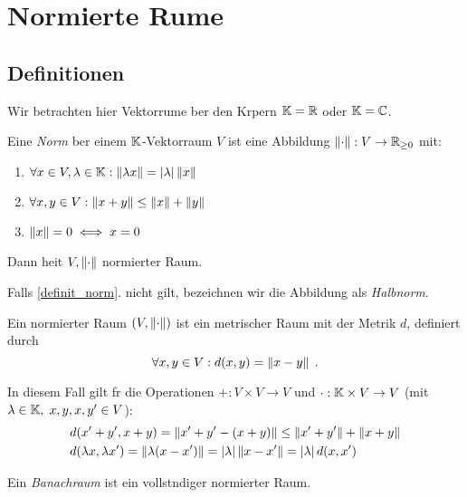 \chapter{Normierte R\as ume}
\section{Definitionen}
\begin{rem}
	Wir betrachten hier Vektorr\as ume \us ber den K\os rpern \(\mathbb{K} = \mathbb{R}\) oder \(\mathbb{K} = \mathbb{C}\).
\end{rem}
\begin{definition}
	Eine \textit{Norm} \us ber einem $\mathbb{K}$-Vektorraum $V$ ist eine Abbildung \(\left\lVert\cdot\right\rVert: V \to \mathbb{R}_{\geq 0}\) mit:
	\begin{enumerate}[noitemsep]
		\item \(\forall x \in V, \lambda \in \mathbb{K}: \left\lVert\lambda x\right\rVert = \left\lvert \lambda \right\rvert \left\lVert x\right\rVert\) \label{skalar_norm}
		\item \(\forall x, y \in V: \left\lVert x+y\right\rVert \leq \left\lVert x\right\rVert + \left\lVert y\right\rVert\)
		\item \(\left\lVert x\right\rVert  = 0 \iff x = 0\) \label{definit_norm}
	\end{enumerate} 
	Dann hei\s t \(V, \left\lVert\cdot\right\rVert\) normierter Raum.
\end{definition}
\begin{rem}
	Falls \ref{definit_norm}. nicht gilt, bezeichnen wir die Abbildung als \textit{Halbnorm}.
\end{rem}

\begin{theorem}
	Ein normierter Raum \((V, \left\lVert\cdot\right\rVert)\) ist ein metrischer Raum mit der Metrik $d$, definiert durch
	\[\forall x, y \in V: d(x,y) = \left\lVert x-y\right\rVert\;.\]
\end{theorem}
\begin{ex}
	In diesem Fall gilt f\us r die Operationen \(+: V\times V \to V\) und \(\cdot: \mathbb{K}\times V \to V\) (mit \(\lambda \in \mathbb{K}, \; x, y, x, y' \in V\)):
	\begin{align*}
		& d(x' + y', x + y) = \left\lVert x' + y' - (x+y)\right\rVert \leq \left\lVert x' + y'\right\rVert + \left\lVert x+y\right\rVert \\
		&d(\lambda x, \lambda x') = \left\lVert\lambda(x-x')\right\rVert = \left\lvert \lambda \right\rvert \left\lVert x-x'\right\rVert = \left\lvert \lambda \right\rvert d(x,x')
	\end{align*}
\end{ex}

\begin{definition}
	Ein \textit{Banachraum} ist ein vollst\as ndiger normierter Raum.
\end{definition}

